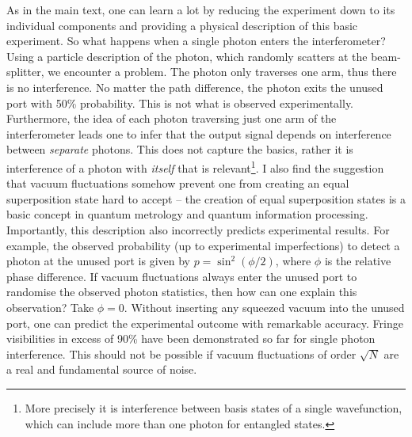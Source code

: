 \documentclass[reqno]{amsart}
\begin{document}
As in the main text, one can learn a lot by reducing the experiment down to its individual components and providing a physical description of this basic experiment. So what happens when a single photon enters the interferometer? Using a particle description of the photon, which randomly scatters at the beam-splitter, we encounter a problem. The photon only traverses one arm, thus there is no interference. No matter the path difference, the photon exits the unused port with 50\% probability. This is not what is observed experimentally. Furthermore, the idea of each photon traversing just one arm of the interferometer leads one to infer that the output signal depends on interference between \textit{separate} photons. This does not capture the basics, rather it is interference of a photon with \textit{itself} that is relevant\footnote{More precisely it is interference between basis states of a single wavefunction, which can include more than one photon for entangled states.}. I also find the suggestion that vacuum fluctuations somehow prevent one from creating an equal superposition state hard to accept -- the creation of equal superposition states is a basic concept in quantum metrology and quantum information processing. Importantly, this description also incorrectly predicts experimental results. For example, the observed probability (up to experimental imperfections) to detect a photon at the unused port is given by $p = \sin^2(\phi/2)$, where $\phi$ is the relative phase difference. If vacuum fluctuations always enter the unused port to randomise the observed photon statistics, then how can one explain this observation? Take $\phi = 0$. Without inserting any squeezed vacuum into the unused port, one can predict the experimental outcome with remarkable accuracy. Fringe visibilities in excess of 90\% have been demonstrated so far for single photon interference. This should not be possible if vacuum fluctuations of order $\sqrt{N}$ are a real and fundamental source of noise.
\end{document}

